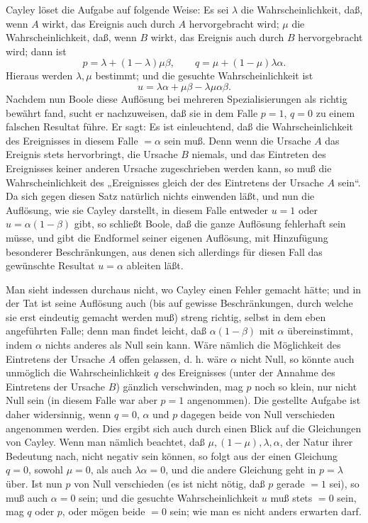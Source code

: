 \documentclass[11pt]{article}
\begin{document}
Cayley löset die Aufgabe auf folgende Weise: Es sei $\lambda$ die Wahrscheinlichkeit, daß, wenn $A$ wirkt, das Ereignis auch durch $A$ hervorgebracht wird; $\mu$ die Wahrscheinlichkeit, daß, wenn $B$ wirkt, das Ereignis auch durch $B$ hervorgebracht wird; dann ist
\[
p=\lambda+(1-\lambda)\mu\beta,
\qquad
q=\mu+(1-\mu)\lambda\alpha.
\]
Hieraus werden $\lambda,\mu$ bestimmt; und die gesuchte Wahrscheinlichkeit ist
\[
u=\lambda\alpha+\mu\beta-\lambda\mu\alpha\beta.
\]
Nachdem nun Boole diese Auflösung bei mehreren Spezialisierungen als richtig bewährt fand, sucht er nachzuweisen, daß sie in dem Falle $p=1$, $q=0$ zu einem falschen Resultat führe. Er sagt: Es ist einleuchtend, daß die Wahrscheinlichkeit des Ereignisses in diesem Falle $=\alpha$ sein muß. Denn wenn die Ursache $A$ das Ereignis stets hervorbringt, die Ursache $B$ niemals, und das Eintreten des Ereignisses keiner anderen Ursache zugeschrieben werden kann, so muß die Wahrscheinlichkeit des „Ereignisses gleich der des Eintretens der Ursache $A$ sein“. Da sich gegen diesen Satz natürlich nichts einwenden läßt, und nun die Auflösung, wie sie Cayley darstellt, in diesem Falle entweder $u=1$ oder $u=\alpha(1-\beta)$ gibt, so schließt Boole, daß die ganze Auflösung fehlerhaft sein müsse, und gibt die Endformel seiner eigenen Auflösung, mit Hinzufügung besonderer Beschränkungen, aus denen sich allerdings für diesen Fall das gewünschte Resultat $u=\alpha$ ableiten läßt.

Man sieht indessen durchaus nicht, wo Cayley einen Fehler gemacht hätte; und in der Tat ist seine Auflösung auch (bis auf gewisse Beschränkungen, durch welche sie erst eindeutig gemacht werden muß) streng richtig, selbst in dem eben angeführten Falle; denn man findet leicht, daß $\alpha(1-\beta)$ mit $\alpha$ übereinstimmt, indem $\alpha$ nichts anderes als Null sein kann. Wäre nämlich die Möglichkeit des Eintretens der Ursache $A$ offen gelassen, d. h. wäre $\alpha$ nicht Null, so könnte auch unmöglich die Wahrscheinlichkeit $q$ des Ereignisses (unter der Annahme des Eintretens der Ursache $B$) gänzlich verschwinden, mag $p$ noch so klein, nur nicht Null sein (in diesem Falle war aber $p=1$ angenommen). Die gestellte Aufgabe ist daher widersinnig, wenn $q=0$, $\alpha$ und $p$ dagegen beide von Null verschieden angenommen werden. Dies ergibt sich auch durch einen Blick auf die Gleichungen von Cayley. Wenn man nämlich beachtet, daß $\mu,(1-\mu),\lambda,\alpha$, der Natur ihrer Bedeutung nach, nicht negativ sein können, so folgt aus der einen Gleichung $q=0$, sowohl $\mu=0$, als auch $\lambda\alpha=0$, und die andere Gleichung geht in $p=\lambda$ über. Ist nun $p$ von Null verschieden (es ist nicht nötig, daß $p$ gerade $=1$ sei), so muß auch $\alpha=0$ sein; und die gesuchte Wahrscheinlichkeit $u$ muß stets $=0$ sein, mag $q$ oder $p$, oder mögen beide $=0$ sein; wie man es nicht anders erwarten darf.
\end{document}

